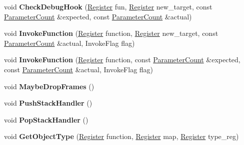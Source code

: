 \begin{DoxyCompactItemize}
\mbox{\label{classv8_1_1internal_1_1MacroAssembler_a2cf2b9ab50d1b6efcd90587f2502451b}} 
void {\bfseries Check\+Debug\+Hook} (\mbox{\hyperlink{classv8_1_1internal_1_1Register}{Register}} fun, \mbox{\hyperlink{classv8_1_1internal_1_1Register}{Register}} new\+\_\+target, const \mbox{\hyperlink{classv8_1_1internal_1_1ParameterCount}{Parameter\+Count}} \&expected, const \mbox{\hyperlink{classv8_1_1internal_1_1ParameterCount}{Parameter\+Count}} \&actual)
\item 
\mbox{\label{classv8_1_1internal_1_1MacroAssembler_a9a69d864f46bb7b56e46d977b24a9fc4}} 
void {\bfseries Invoke\+Function} (\mbox{\hyperlink{classv8_1_1internal_1_1Register}{Register}} function, \mbox{\hyperlink{classv8_1_1internal_1_1Register}{Register}} new\+\_\+target, const \mbox{\hyperlink{classv8_1_1internal_1_1ParameterCount}{Parameter\+Count}} \&actual, Invoke\+Flag flag)
\item 
\mbox{\label{classv8_1_1internal_1_1MacroAssembler_ab075992a89587b70b074351e93c41bb8}} 
void {\bfseries Invoke\+Function} (\mbox{\hyperlink{classv8_1_1internal_1_1Register}{Register}} function, const \mbox{\hyperlink{classv8_1_1internal_1_1ParameterCount}{Parameter\+Count}} \&expected, const \mbox{\hyperlink{classv8_1_1internal_1_1ParameterCount}{Parameter\+Count}} \&actual, Invoke\+Flag flag)
\item 
\mbox{\label{classv8_1_1internal_1_1MacroAssembler_a24c22317b3c647e2829321dade36cf73}} 
void {\bfseries Maybe\+Drop\+Frames} ()
\item 
\mbox{\label{classv8_1_1internal_1_1MacroAssembler_af8ec8c2c3c525fa27b47125b8f2c90fb}} 
void {\bfseries Push\+Stack\+Handler} ()
\item 
\mbox{\label{classv8_1_1internal_1_1MacroAssembler_aaec1b780d52416c78d49b94483afa4f8}} 
void {\bfseries Pop\+Stack\+Handler} ()
\item 
\mbox{\label{classv8_1_1internal_1_1MacroAssembler_a09d1c8174d83d9bddd207035cfa4485b}} 
void {\bfseries Get\+Object\+Type} (\mbox{\hyperlink{classv8_1_1internal_1_1Register}{Register}} function, \mbox{\hyperlink{classv8_1_1internal_1_1Register}{Register}} map, \mbox{\hyperlink{classv8_1_1internal_1_1Register}{Register}} type\+\_\+reg)

\end{DoxyCompactItemize}

